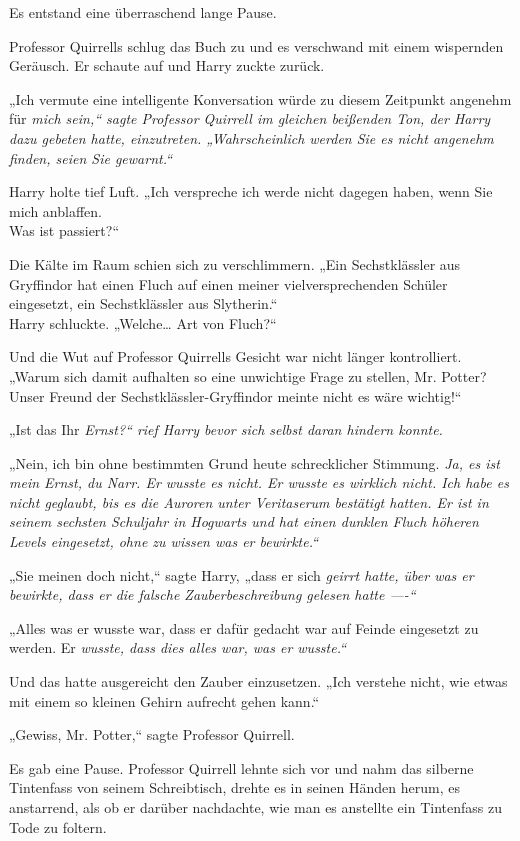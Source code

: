 {Es entstand eine überraschend lange Pause.

Professor Quirrells schlug das Buch zu und es verschwand mit einem wispernden Geräusch. Er schaute auf und Harry zuckte zurück.

„Ich vermute eine intelligente Konversation würde zu diesem Zeitpunkt angenehm für \emph{mich sein,“ sagte Professor Quirrell im gleichen beißenden Ton, der Harry dazu gebeten hatte, einzutreten. „Wahrscheinlich werden Sie es nicht angenehm finden, seien Sie gewarnt.“}

Harry holte tief Luft. „Ich verspreche ich werde nicht dagegen haben, wenn Sie mich anblaffen.\\ Was ist passiert?“

Die Kälte im Raum schien sich zu verschlimmern. „Ein Sechstklässler aus Gryffindor hat einen Fluch auf einen meiner vielversprechenden Schüler eingesetzt, ein Sechstklässler aus Slytherin.“\\ Harry schluckte. „Welche… Art von Fluch?“

Und die Wut auf Professor Quirrells Gesicht war nicht länger kontrolliert. „Warum sich damit aufhalten so eine unwichtige Frage zu stellen, Mr. Potter? Unser Freund der Sechstklässler-Gryffindor meinte nicht es wäre wichtig!“

„Ist das Ihr \emph{Ernst?“ rief Harry bevor sich selbst daran hindern konnte.}

„Nein, ich bin ohne bestimmten Grund heute schrecklicher Stimmung. \emph{Ja, es ist mein Ernst, \emph{du Narr.} Er wusste es nicht. Er \emph{wusste es wirklich nicht}. Ich habe es nicht geglaubt, bis es die Auroren unter Veritaserum bestätigt hatten. Er ist in seinem \emph{sechsten Schuljahr in Hogwarts} und hat einen dunklen Fluch höheren Levels eingesetzt, \emph{ohne zu wissen was er bewirkte}.“}

„Sie meinen doch nicht,“ sagte Harry, „dass er sich \emph{geirrt hatte, über was er bewirkte, dass er die falsche Zauberbeschreibung gelesen hatte ----“}

„Alles was er wusste war, dass er dafür gedacht war auf Feinde eingesetzt zu werden. Er \emph{wusste, dass dies alles war, was er wusste.“}

Und das hatte ausgereicht den Zauber einzusetzen. „Ich verstehe nicht, wie etwas mit einem so kleinen Gehirn aufrecht gehen kann.“

„Gewiss, Mr. Potter,“ sagte Professor Quirrell.

Es gab eine Pause. Professor Quirrell lehnte sich vor und nahm das silberne Tintenfass von seinem Schreibtisch, drehte es in seinen Händen herum, es anstarrend, als ob er darüber nachdachte, wie man es anstellte ein Tintenfass zu Tode zu foltern.

}
